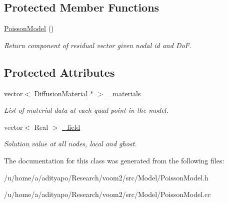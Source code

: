 \subsection*{Protected Member Functions}
\begin{DoxyCompactItemize}
\item 
\hypertarget{classvoom_1_1_poisson_model_a3e6a10280942063968d9fb80fade83c4}{
\hyperlink{classvoom_1_1_poisson_model_a3e6a10280942063968d9fb80fade83c4}{PoissonModel} ()}
\label{classvoom_1_1_poisson_model_a3e6a10280942063968d9fb80fade83c4}

\begin{DoxyCompactList}\small\item\em Return component of residual vector given nodal id and DoF. \item\end{DoxyCompactList}\end{DoxyCompactItemize}
\subsection*{Protected Attributes}
\begin{DoxyCompactItemize}
\item 
\hypertarget{classvoom_1_1_poisson_model_aa719cf6337a762f803f389ad39192057}{
vector$<$ \hyperlink{classvoom_1_1_diffusion_material}{DiffusionMaterial} $\ast$ $>$ \hyperlink{classvoom_1_1_poisson_model_aa719cf6337a762f803f389ad39192057}{\_\-materials}}
\label{classvoom_1_1_poisson_model_aa719cf6337a762f803f389ad39192057}

\begin{DoxyCompactList}\small\item\em List of material data at each quad point in the model. \item\end{DoxyCompactList}\item 
\hypertarget{classvoom_1_1_poisson_model_af09bf3fbb7500cf5ee7547cd26ee7cb0}{
vector$<$ Real $>$ \hyperlink{classvoom_1_1_poisson_model_af09bf3fbb7500cf5ee7547cd26ee7cb0}{\_\-field}}
\label{classvoom_1_1_poisson_model_af09bf3fbb7500cf5ee7547cd26ee7cb0}

\begin{DoxyCompactList}\small\item\em Solution value at all nodes, local and ghost. \item\end{DoxyCompactList}\end{DoxyCompactItemize}


The documentation for this class was generated from the following files:\begin{DoxyCompactItemize}
\item 
/u/home/a/adityapo/Research/voom2/src/Model/PoissonModel.h\item 
/u/home/a/adityapo/Research/voom2/src/Model/PoissonModel.cc\end{DoxyCompactItemize}
